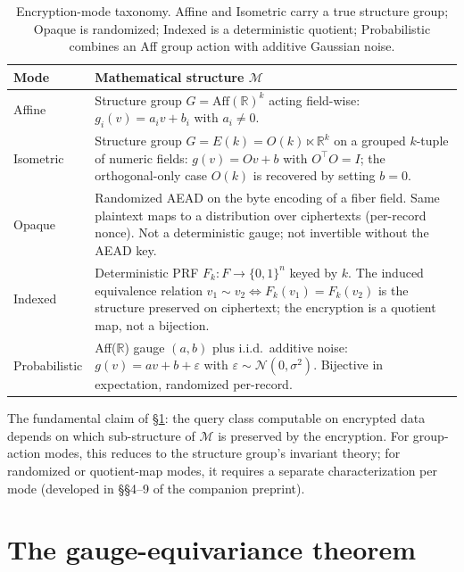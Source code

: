\documentclass[11pt,letterpaper]{article}
\begin{document}
\begin{table}[h]
\centering
\small
\begin{tabular}{p{2cm}p{9cm}}
\toprule
\textbf{Mode} & \textbf{Mathematical structure $\mathcal{M}$} \\
\midrule
Affine & Structure group $G = \mathrm{Aff}(\mathbb{R})^k$ acting field-wise: $g_i(v) = a_i v + b_i$ with $a_i \neq 0$. \\
Isometric & Structure group $G = E(k) = O(k) \ltimes \mathbb{R}^k$ on a grouped $k$-tuple of numeric fields: $g(v) = O v + b$ with $O^\top O = I$; the orthogonal-only case $O(k)$ is recovered by setting $b = 0$. \\
Opaque & Randomized AEAD on the byte encoding of a fiber field. Same plaintext maps to a distribution over ciphertexts (per-record nonce). Not a deterministic gauge; not invertible without the AEAD key. \\
Indexed & Deterministic PRF $F_k: F \to \{0,1\}^n$ keyed by $k$. The induced equivalence relation $v_1 \sim v_2 \Leftrightarrow F_k(v_1) = F_k(v_2)$ is the structure preserved on ciphertext; the encryption is a quotient map, not a bijection. \\
Probabilistic & Aff($\mathbb{R}$) gauge $(a, b)$ plus i.i.d.~additive noise: $g(v) = a v + b + \varepsilon$ with $\varepsilon \sim \mathcal{N}(0, \sigma^2)$. Bijective in expectation, randomized per-record. \\
\bottomrule
\end{tabular}
\caption{Encryption-mode taxonomy. Affine and Isometric carry a true
structure group; Opaque is randomized; Indexed is a deterministic
quotient; Probabilistic combines an Aff group action with additive
Gaussian noise.}
\label{tab:taxonomy}
\end{table}

The fundamental claim of \S\ref{sec:gauge-invariance}: the query class
computable on encrypted data depends on which sub-structure of
$\mathcal{M}$ is preserved by the encryption. For group-action modes,
this reduces to the structure group's invariant theory; for
randomized or quotient-map modes, it requires a separate
characterization per mode (developed in \S\S 4--9 of the
companion preprint).


\section{The gauge-equivariance theorem}
\label{sec:gauge-invariance}
\end{document}
